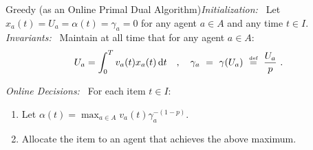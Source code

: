 \documentclass[11pt,letterpaper]{article}
\newcommand{\dif}[1]{\,\text{\rm d} #1}
\newcommand{\utility}{U}
\newcommand{\defeq}{\stackrel{\textrm{\tiny def}}{=}}
\begin{document}
\begin{algorithm}{Greedy (as an Online Primal Dual Algorithm)}\emph{Initialization:~}
   	Let $x_a(t) = \utility_a = \alpha(t) = \gamma_a = 0$ for any agent $a\in A$ and any time $t\in I$.\\[2ex]
	\emph{Invariants:~}
	Maintain at all time that for any agent $a\in A$:
    \begin{equation}
    	\label{eq:invariant-devanur-jain}
    	\utility_a = \int_0^T v_a(t) x_a(t) \dif{t} \quad,\quad \gamma_a ~=~ \gamma(\utility_a) ~\defeq~ \frac{\utility_a}{p}
		~.
	\end{equation}

	\emph{Online Decisions:~}
	For each item $t\in I$:
	\begin{enumerate}
		\item Let $\alpha(t) = \max_{a \in A} v_a(t) \gamma_a^{-(1-p)}$.
		\item Allocate the item to an agent that achieves the above maximum.
	\end{enumerate}
\end{algorithm}
	
\medskip
\end{document}
